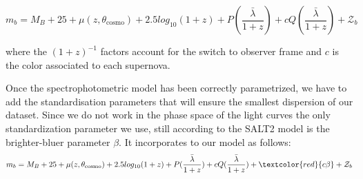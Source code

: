 \documentclass[\docopts]{\docclass}
\begin{document}
\begin{equation}
m_b = M_B + 25 + \mu(z, \theta_\text{cosmo}) + 2.5log_{10}(1+z) + P(\frac{\bar \lambda}{1+z}) + cQ(\frac{\bar \lambda}{1+z})+ \mathcal{Z}_b
\end{equation}

where the $(1+z)^{-1}$ factors account for the switch to observer frame and $c$ is the color associated to each supernova.


Once the spectrophotometric model has been correctly parametrized, we have to add the standardisation parameters that will ensure the smallest dispersion of our dataset.
Since we do not work in the phase space of the light curves the only standardization parameter we use, still according to the SALT2 model is the brighter-bluer parameter $\beta$.
It incorporates to our model as follows:
\begin{equation}
\label{eq::model}
m_b = M_B + 25 + \mu(z, \theta_\text{cosmo}) + 2.5log_{10}(1+z) + P(\frac{\bar \lambda}{1+z}) + cQ(\frac{\bar \lambda}{1+z}) + \textcolor{red}{c\beta}+ \mathcal{Z}_b
\end{equation}

\end{document}
